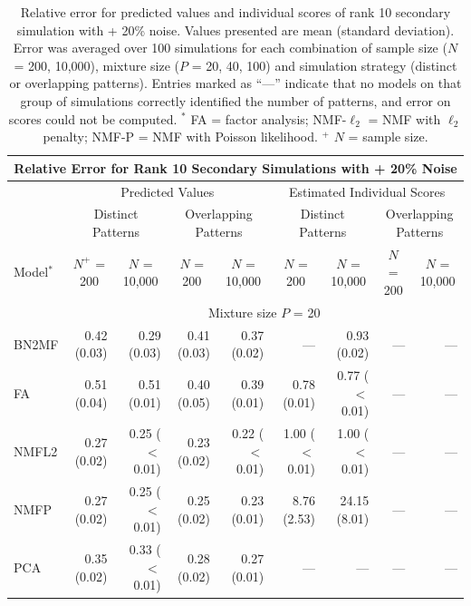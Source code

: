 {\clearpage
\begin{landscape}
\begingroup
\renewcommand{\arraystretch}{1.2}
\begin{table}[!htbp] \centering 
  \caption[Relative error for rank 10 secondary simulations]{\small Relative error for predicted values and individual scores of rank 10 secondary simulation with + 20\% noise. Values presented are mean (standard deviation). Error was averaged over 100 simulations for each combination of sample size ($N$ = 200, 10,000), mixture size ($P$ = 20, 40, 100) and simulation strategy (distinct or overlapping patterns). Entries marked as ``---'' indicate that no models on that group of simulations correctly identified the number of patterns, and error on scores could not be computed. $^*$ FA = factor analysis; NMF-$\ell_2$ = NMF with $\ell_2$ penalty; NMF-P = NMF with Poisson likelihood. $^+$ $N$ = sample size.} 
  \label{table:sup10} 
 \addtolength{\tabcolsep}{-2pt}
\small
\begin{tabular}{lrr|rr|rr|rr}
\multicolumn{9}{c}{Relative Error for Rank 10 Secondary Simulations with + 20\% Noise} \\
\hline 
\hline  
& \multicolumn{4}{c}{Predicted Values} & \multicolumn{4}{c}{Estimated Individual Scores} \\
\hline
\hline
& \multicolumn{2}{c}{Distinct Patterns} & \multicolumn{2}{c}{Overlapping Patterns} & \multicolumn{2}{c}{Distinct Patterns} & \multicolumn{2}{c}{Overlapping Patterns} \\
\hline
\hline  
Model$^*$ & \multicolumn{1}{c}{$N^+$ = 200} & \multicolumn{1}{c}{$N$ = 10,000} & \multicolumn{1}{c}{$N$ = 200} & \multicolumn{1}{c}{$N$ = 10,000} & \multicolumn{1}{c}{$N$ = 200} & \multicolumn{1}{c}{$N$ = 10,000} & \multicolumn{1}{c}{$N$ = 200} & \multicolumn{1}{c}{$N$ = 10,000} \\
\hline
\hline  
& \multicolumn{8}{c}{Mixture size $P$ = 20} \\
\hline
BN2MF & 0.42 (0.03) & 0.29 (0.03) & 0.41 (0.03) & 0.37 (0.02) & --- & 0.93 (0.02) & --- & --- \\ 
FA & 0.51 (0.04) & 0.51 (0.01) & 0.40 (0.05) & 0.39 (0.01) & 0.78 (0.01) & 0.77 ($<$0.01) & --- & --- \\ 
NMFL2 & 0.27 (0.02) & 0.25 ($<$0.01) & 0.23 (0.02) & 0.22 ($<$0.01) & 1.00 ($<$0.01) & 1.00 ($<$0.01) & --- & --- \\ 
NMFP & 0.27 (0.02) & 0.25 ($<$0.01) & 0.25 (0.02) & 0.23 (0.01) & 8.76 (2.53) & 24.15 (8.01) & --- & --- \\ 
PCA & 0.35 (0.02) & 0.33 ($<$0.01) & 0.28 (0.02) & 0.27 (0.01) & --- & --- & --- & --- \\ 

\end{tabular}
\end{table}
\end{landscape}}
